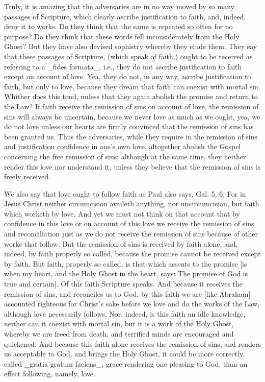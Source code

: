 Truly, it is amazing that the adversaries are in no way moved by so
many passages of Scripture, which clearly ascribe justification to
faith, and, indeed, deny it to works.  Do they think that the same is
repeated so often for no purpose?  Do they think that these words
fell inconsiderately from the Holy Ghost?  But they have also devised
sophistry whereby they elude them.  They say that these passages of
Scripture, (which speak of faith,) ought to be received as referring
to a _fides formata_, i.e., they do not ascribe justification to
faith except on account of love.  Yea, they do not, in any way,
ascribe justification to faith, but only to love, because they dream
that faith can coexist with mortal sin.  Whither does this tend,
unless that they again abolish the promise and return to the Law?  If
faith receive the remission of sins on account of love, the remission
of sins will always be uncertain, because we never love as much as we
ought, yea, we do not love unless our hearts are firmly convinced
that the remission of sins has been granted us.  Thus the adversaries,
while they require in the remission of sins and justification
confidence in one's own love, altogether abolish the Gospel
concerning the free remission of sins; although at the same time,
they neither render this love nor understand it, unless they believe
that the remission of sins is freely received.

We also say that love ought to follow faith as Paul also says, Gal. 5,
6: For in Jesus Christ neither circumcision availeth anything, nor
uncircumcision, but faith which worketh by love.  And yet we must not
think on that account that by confidence in this love or on account
of this love we receive the remission of sins and reconciliation just
as we do not receive the remission of sins because of other works
that follow.  But the remission of sins is received by faith alone,
and, indeed, by faith properly so called, because the promise cannot
be received except by faith.  But faith, properly so called, is that
which assents to the promise [is when my heart, and the Holy Ghost in
the heart, says: The promise of God is true and certain].  Of this
faith Scripture speaks.  And because it receives the remission of
sins, and reconciles us to God, by this faith we are [like Abraham]
accounted righteous for Christ's sake before we love and do the works
of the Law, although love necessarily follows.  Nor, indeed, is this
faith an idle knowledge, neither can it coexist with mortal sin, but
it is a work of the Holy Ghost, whereby we are freed from death, and
terrified minds are encouraged and quickened.  And because this faith
alone receives the remission of sins, and renders us acceptable to
God, and brings the Holy Ghost, it could be more correctly called
_gratia gratum faciens_, grace rendering one pleasing to God, than an
effect following, namely, love.


